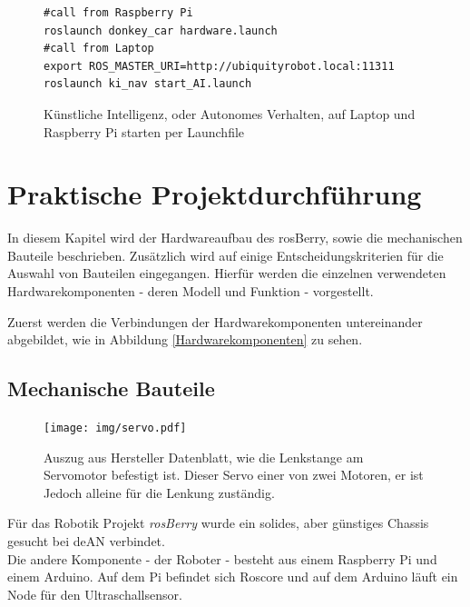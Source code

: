 \documentclass[conference]{IEEEtran}
\begin{document}
	\begin{figure}[h]
		\centering
\begin{verbatim}
#call from Raspberry Pi
roslaunch donkey_car hardware.launch
#call from Laptop
export ROS_MASTER_URI=http://ubiquityrobot.local:11311
roslaunch ki_nav start_AI.launch
		\end{verbatim}
		\label{KI-launch}
		\caption{Künstliche Intelligenz, oder Autonomes Verhalten, auf Laptop 
		und Raspberry Pi starten per Launchfile }
	\end{figure}
	
	\section{Praktische Projektdurchführung}
	
	
	In diesem Kapitel wird der Hardwareaufbau des rosBerry, sowie die 
	mechanischen Bauteile beschrieben. Zusätzlich wird auf einige 
	Entscheidungskriterien für die Auswahl von Bauteilen eingegangen. 
	Hierfür werden die einzelnen verwendeten Hardwarekomponenten - deren Modell und Funktion - vorgestellt. 
	
	Zuerst werden die Verbindungen der Hardwarekomponenten untereinander abgebildet, wie in Abbildung \ref{Hardwarekomponenten} zu sehen.
	\subsection{Mechanische Bauteile}
	
	\begin{figure}[h]
		\centering
		\texttt{[image: img/servo.pdf]}
		\caption{Auszug aus Hersteller Datenblatt, wie die Lenkstange am 
		Servomotor  befestigt ist. Dieser Servo einer von zwei Motoren, er  ist 
		Jedoch alleine für die Lenkung zuständig. }
		\label{Servomotor}
	\end{figure}
	Für das Robotik Projekt \textit{rosBerry} wurde ein solides, aber 
	günstiges Chassis gesucht bei deAN verbindet.
	\\
	Die andere Komponente - der Roboter - besteht aus einem Raspberry Pi 
	und einem Arduino.
	Auf dem Pi befindet sich Roscore und auf dem Arduino läuft ein Node für 
	den Ultraschallsensor.
	
\end{document}
